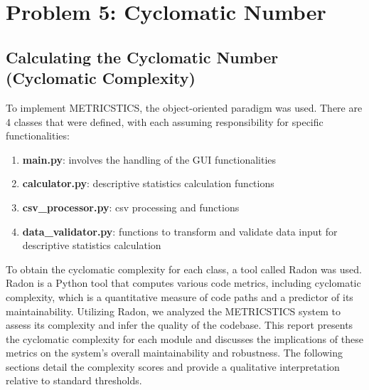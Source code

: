\section{Problem 5: Cyclomatic Number}

\subsection{Calculating the Cyclomatic Number (Cyclomatic Complexity)}

To implement METRICSTICS, the object-oriented paradigm was used. There are 4 classes that were defined, with each assuming responsibility for specific functionalities: 
\begin{enumerate}
    \item \textbf{main.py}: involves the handling of the GUI functionalities
    \item \textbf{calculator.py}: descriptive statistics calculation functions
    \item \textbf{csv\_processor.py}: csv processing and functions
    \item \textbf{data\_validator.py}: functions to transform and validate data input for descriptive statistics calculation
\end{enumerate}

To obtain the cyclomatic complexity for each class, a tool called Radon was used. Radon is a Python tool that computes various code metrics, including cyclomatic complexity, which is a quantitative measure of code paths and a predictor of its maintainability. Utilizing Radon, we analyzed the METRICSTICS system to assess its complexity and infer the quality of the codebase. This report presents the cyclomatic complexity for each module and discusses the implications of these metrics on the system's overall maintainability and robustness. The following sections detail the complexity scores and provide a qualitative interpretation relative to standard thresholds.

